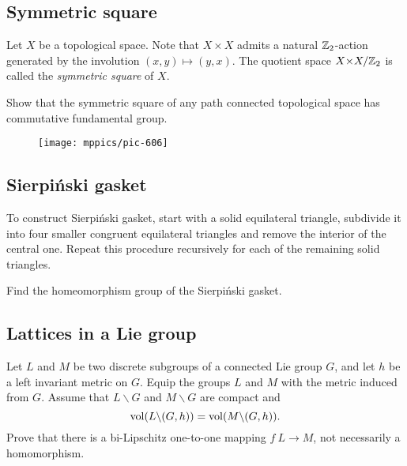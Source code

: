 \subsection*{Symmetric square\easy}\label{Symmetric square}

Let $X$ be a topological space.
Note that $X{\times} X$ admits a natural $\mathbb{Z}_2$-action generated by the involution $(x,y)\mapsto (y,x)$.
The quotient  space $X{\times} X/\mathbb{Z}_2$ is called the \emph{symmetric square} of $X$.

\begin{pr} 
Show that the symmetric square 
of any path connected topological space 
has commutative fundamental group.
\end{pr}

{

\begin{wrapfigure}{r}{23 mm}
\vskip-0mm
\centering
\texttt{[image: mppics/pic-606]}
\end{wrapfigure}

\subsection*{Sierpi\'nski gasket\easy}\label{Sierpinski triangle}

To construct Sierpi\'nski gasket, start with a solid  equilateral triangle, subdivide it into four smaller congruent equilateral triangles and remove the interior of the central one.
Repeat this procedure recursively for each of the remaining solid triangles.

}

\begin{pr} 
Find the homeomorphism group of the Sierpi\'nski gasket.
\end{pr}



\subsection*{Lattices in a Lie group}\label{Boys and girls in a Lie group}

\begin{pr}
Let $L$ and $M$ be two discrete subgroups of a connected Lie group $G$,
and let $h$ be a left invariant metric on $G$.
Equip the groups $L$ and $M$ 
with the metric induced from $G$.
Assume that $L\backslash G$ and $M\backslash G$ are compact and
$$\operatorname{\rm vol}\nolimits(L\backslash (G,h))
=
\operatorname{\rm vol}\nolimits(M\backslash (G,h)).$$
Prove that there is a bi-Lipschitz one-to-one mapping $f\:L
\to
M$, not necessarily a homomorphism.
\end{pr}


